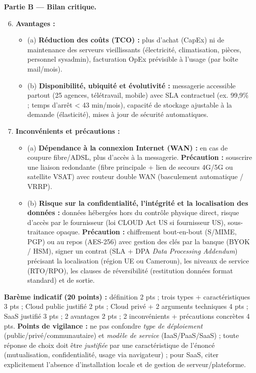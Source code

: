 \documentclass[11pt]{article}
\begin{document}
\begin{corrige}
\begin{enumerate}
\end{enumerate}
\textbf{Partie B — Bilan critique.}
\begin{enumerate}
    \setcounter{enumi}{5}
    \item \textbf{Avantages :}
    \begin{itemize}
        \item (a) \textbf{Réduction des coûts (TCO) :} plus d'achat (CapEx) ni de maintenance des serveurs vieillissants (électricité, climatisation, pièces, personnel sysadmin), facturation OpEx prévisible à l'usage (par boîte mail/mois).
        \item (b) \textbf{Disponibilité, ubiquité et évolutivité :} messagerie accessible partout (25 agences, télétravail, mobile) avec SLA contractuel (ex. 99,9\% ; temps d'arrêt < 43 min/mois), capacité de stockage ajustable à la demande (élasticité), mises à jour de sécurité automatiques.
    \end{itemize}
    \item \textbf{Inconvénients et précautions :}
    \begin{itemize}
        \item (a) \textbf{Dépendance à la connexion Internet (WAN) :} en cas de coupure fibre/ADSL, plus d'accès à la messagerie. \textbf{Précaution :} souscrire une liaison redondante (fibre principale + lien de secours 4G/5G ou satellite VSAT) avec routeur double WAN (basculement automatique / VRRP).
        \item (b) \textbf{Risque sur la confidentialité, l'intégrité et la localisation des données :} données hébergées hors du contrôle physique direct, risque d'accès par le fournisseur (loi CLOUD Act US si fournisseur US), sous-traitance opaque. \textbf{Précaution :} chiffrement bout-en-bout (S/MIME, PGP) ou au repos (AES-256) avec gestion des clés par la banque (BYOK / HSM), signer un contrat (SLA + DPA \emph{Data Processing Addendum}) précisant la localisation (région UE ou Cameroun), les niveaux de service (RTO/RPO), les clauses de réversibilité (restitution données format standard) et de sortie.
    \end{itemize}
\end{enumerate}
\textbf{Barème indicatif (20 points) :} définition 2 pts ; trois types + caractéristiques 3 pts ; Cloud public justifié 2 pts ; Cloud privé + 2 arguments techniques 4 pts ; SaaS justifié 3 pts ; 2 avantages 2 pts ; 2 inconvénients + précautions concrètes 4 pts.
\textbf{Points de vigilance :} ne pas confondre \emph{type de déploiement} (public/privé/communautaire) et \emph{modèle de service} (IaaS/PaaS/SaaS) ; toute réponse de choix doit être \emph{justifiée} par une caractéristique de l'énoncé (mutualisation, confidentialité, usage via navigateur) ; pour SaaS, citer explicitement l'absence d'installation locale et de gestion de serveur/plateforme.
\end{corrige}
\end{document}
